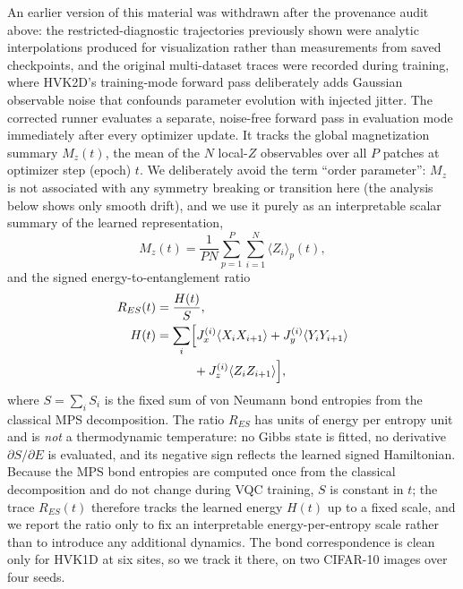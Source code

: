 \documentclass[11pt]{article}
\begin{document}
An earlier version of this material was withdrawn after the provenance audit above: the restricted-diagnostic trajectories previously shown were analytic interpolations produced for visualization rather than measurements from saved checkpoints, and the original multi-dataset traces were recorded during training, where HVK2D's training-mode forward pass deliberately adds Gaussian observable noise that confounds parameter evolution with injected jitter. The corrected runner evaluates a separate, noise-free forward pass in evaluation mode immediately after every optimizer update. It tracks the global magnetization summary $M_z(t)$, the mean of the $N$ local-$Z$ observables over all $P$ patches at optimizer step (epoch) $t$. We deliberately avoid the term ``order parameter'': $M_z$ is not associated with any symmetry breaking or transition here (the analysis below shows only smooth drift), and we use it purely as an interpretable scalar summary of the learned representation,
\begin{equation}
M_z(t) = \frac{1}{P N}\sum_{p=1}^{P}\sum_{i=1}^{N}\langle Z_i\rangle_p(t),
\label{eq:order_parameter}
\end{equation}
and the signed energy-to-entanglement ratio
\begin{align}
R_{ES}(t)&=\frac{H(t)}{S},\\
H(t)&=\sum_i\Bigl[J_x^{(i)}\langle X_iX_{i+1}\rangle
+J_y^{(i)}\langle Y_iY_{i+1}\rangle \nonumber\\
&\hspace{3.0em}+J_z^{(i)}\langle Z_iZ_{i+1}\rangle\Bigr],
\end{align}
where $S=\sum_i S_i$ is the fixed sum of von Neumann bond entropies from the classical MPS decomposition. The ratio $R_{ES}$ has units of energy per entropy unit and is \emph{not} a thermodynamic temperature: no Gibbs state is fitted, no derivative $\partial S/\partial E$ is evaluated, and its negative sign reflects the learned signed Hamiltonian. Because the MPS bond entropies are computed once from the classical decomposition and do not change during VQC training, $S$ is constant in $t$; the trace $R_{ES}(t)$ therefore tracks the learned energy $H(t)$ up to a fixed scale, and we report the ratio only to fix an interpretable energy-per-entropy scale rather than to introduce any additional dynamics. The bond correspondence is clean only for HVK1D at six sites, so we track it there, on two CIFAR-10 images over four seeds.
\end{document}
